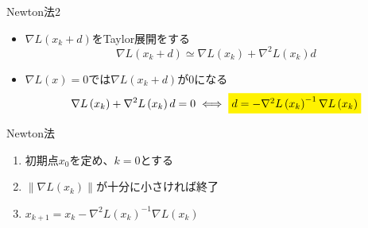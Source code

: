 \documentclass[dvipdfmx,12pt]{beamer}
\begin{document}
    \begin{frame}{Newton法2}
        \footnotesize

        \vspace{1em}

        \begin{itemize}
            \item $\nabla L \left (x_k+d \right )$をTaylor展開をする
            \begin{equation*}
                \nabla L\left(x_k + d\right) \simeq \nabla L\left(x_k\right)+\nabla ^ 2 L\left(x_k\right)d
            \end{equation*}
            \item $\nabla L \left(x\right)=0$では$\nabla L \left(x_k + d\right)$が0になる
            \begin{equation*}
                \nabla L\left(x_k\right)+\nabla ^ 2 L\left(x_k\right)d=0 \iff \colorbox{yellow}{$d =-\nabla ^2 L\left(x_k\right) ^ {-1} \nabla L \left(x_k\right)$}
            \end{equation*}
        \end{itemize}

        \begin{block}{Newton法}
            \begin{enumerate}
                \item 初期点$x_0$を定め、$k=0$とする
                \item $\lVert \nabla L\left(x_k\right) \rVert$が十分に小さければ終了
                \item $x_{k+1}=x_k-\nabla ^2 L\left(x_k\right) ^ {-1} \nabla L \left(x_k\right)$
            \end{enumerate}
        \end{block}

    \end{frame}
\end{document}
